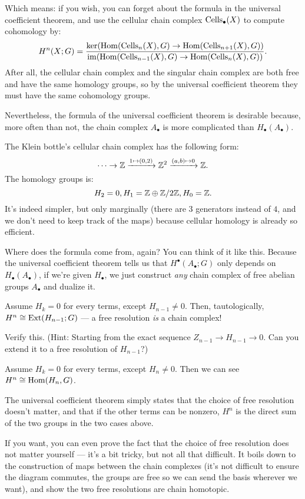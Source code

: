 Which means: if you wish, you can forget about the formula in the universal coefficient theorem,
and use the cellular chain complex $\operatorname{Cells}_\bullet(X)$ to compute cohomology by:
\[ H^n(X; G) = \frac{\ker(\operatorname{Hom}(\operatorname{Cells}_n(X), G) \to \operatorname{Hom}(\operatorname{Cells}_{n+1}(X), G))}
{\operatorname{im}(\operatorname{Hom}(\operatorname{Cells}_{n-1}(X), G) \to \operatorname{Hom}(\operatorname{Cells}_{n}(X), G))}. \]
After all, the cellular chain complex and the singular chain complex are both free and have the same
homology groups, so by the universal coefficient theorem they must have the same cohomology groups.

Nevertheless, the formula of the universal coefficient theorem is desirable because, more often than
not, the chain complex $A_\bullet$ is more complicated than $H_\bullet(A_\bullet)$.

\begin{example}
	The Klein bottle's cellular chain complex has the following form:
	\[ \cdots \to \mathbb Z \xrightarrow{1 \mapsto (0, 2)} \mathbb Z^2 \xrightarrow{(a, b) \mapsto 0} \mathbb Z. \]
	The homology groups is:
	\[ H_2 = 0, H_1 = \mathbb Z \oplus \mathbb Z/2\mathbb Z, H_0 = \mathbb Z. \]
	It's indeed simpler, but only marginally (there are $3$ generators instead of $4$, and we don't
	need to keep track of the maps)
	because cellular homology is already so efficient.
\end{example}

Where does the formula come from, again? You can think of it like this.
Because the universal coefficient theorem tells us that $H^\bullet(A_\bullet; G)$ only depends on
$H_\bullet(A_\bullet)$, if we're given $H_\bullet$, we just construct \emph{any} chain complex of
free abelian groups $A_\bullet$ and dualize it.

Assume $H_k = 0$ for every terms, except $H_{n-1}\neq 0$. Then, tautologically,
$H^n \cong \operatorname{Ext}(H_{n-1}; G)$ --- a free resolution \emph{is} a chain complex!

\begin{exercise}
	Verify this. (Hint: Starting from the exact sequence $Z_{n-1} \to H_{n-1} \to 0$.
	Can you extend it to a free resolution of $H_{n-1}$?)
\end{exercise}

Assume $H_k = 0$ for every terms, except $H_n \neq 0$. Then we can see $H^n \cong \operatorname{Hom}(H_n, G)$.

The universal coefficient theorem simply states that the choice of free resolution doesn't matter,
and that if the other terms can be nonzero, $H^n$ is the direct sum of the two groups in the two
cases above.

If you want, you can even prove the fact that the choice of free resolution does not matter yourself
--- it's a bit tricky, but not all that difficult. It boils down to the construction of maps
between the chain complexes (it's not difficult to ensure the diagram commutes, the groups are free
so we can send the basis wherever we want), and show the two free resolutions are chain homotopic.

